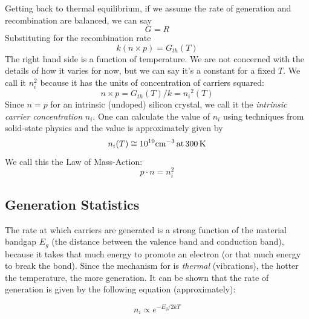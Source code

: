 Getting back to thermal equilibrium, if we assume the rate of generation and recombination are balanced, we can say
%
\begin{equation} G = R \end{equation}
%
Substituting for the recombination rate
%
\begin{equation} k(n \times p) = {G_{th}}(T) \end{equation}
%
The right hand side is a function of temperature.  We are not concerned with the details of how it varies for now, but we can say it’s a constant for a fixed $T$.  We call it $n_i^2$ because it has the units of concentration of carriers squared:
\begin{equation} n \times p = {G_{th}}(T)/k = {n_i}^2(T) \end{equation}
%
Since $n=p$ for an intrinsic (undoped) silicon crystal, we call it the \emph{intrinsic carrier concentration} $n_i$.  One can calculate the value of $n_i$ using techniques from solid-state physics and the value is approximately given by 
\begin{equation} {n_i}(T) \cong {10^{10}}{\rm{c}}{{\rm{m}}^{ - 3}}\,{\rm{at}}\,300\,{\rm{K}}
\end{equation}
We call this the Law of Mass-Action:
\begin{equation}
        p \cdot n = n_i^2
\end{equation}








\subsection{Generation Statistics}




 The rate at which carriers are generated is a strong function of the material bandgap $E_g$ (the distance between the valence band and conduction band), because it takes that much energy to promote an electron (or that much energy to break the bond).  Since the mechanism for is \textit{thermal} (vibrations), the hotter the temperature, the more generation.    It can be shown that the rate of generation is given by the following equation (approximately):


\begin{equation}
        n_i \propto e^{-E_g/2kT}
\end{equation}


